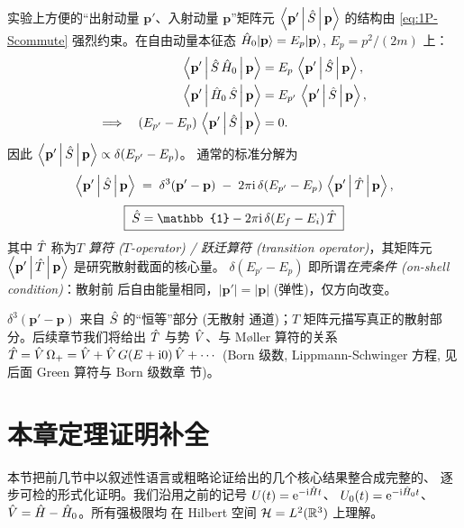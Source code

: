 实验上方便的“出射动量 $\mathbf{p}'$、入射动量 $\mathbf{p}$”矩阵元
$\left\langle \mathbf{p}' \,\middle|\, \hat{S} \,\middle|\, \mathbf{p} \right\rangle$ 的结构由 \eqref{eq:1P-Scommute}
强烈约束。在自由动量本征态 $\hat{H}_0|\mathbf{p}\rangle =
E_p|\mathbf{p}\rangle$, $E_p=p^2/(2m)$ 上：
\begin{align}
  \left\langle \mathbf{p}' \,\middle|\, \hat{S}\,\hat{H}_0 \,\middle|\, \mathbf{p} \right\rangle
  &=E_p\,\left\langle \mathbf{p}' \,\middle|\, \hat{S} \,\middle|\, \mathbf{p} \right\rangle, \nonumber\\
  \left\langle \mathbf{p}' \,\middle|\, \hat{H}_0\,\hat{S} \,\middle|\, \mathbf{p} \right\rangle
  &=E_{p'}\,\left\langle \mathbf{p}' \,\middle|\, \hat{S} \,\middle|\, \mathbf{p} \right\rangle,\nonumber\\
  \Longrightarrow\quad
  (E_{p'}-E_p)\,\left\langle \mathbf{p}' \,\middle|\, \hat{S} \,\middle|\, \mathbf{p} \right\rangle
  &=0.
  \label{eq:1P-onshell-prepare}
\end{align}
因此 $\left\langle \mathbf{p}' \,\middle|\, \hat{S} \,\middle|\, \mathbf{p} \right\rangle\propto \delta(E_{p'}-E_p)$。
通常的标准分解为
\begin{equation}
  \left\langle \mathbf{p}' \,\middle|\, \hat{S} \,\middle|\, \mathbf{p} \right\rangle
  \;=\; \delta^3(\mathbf{p}'-\mathbf{p})
   \;-\; 2\pi\mathrm{i}\,\delta(E_{p'}-E_p)\,
        \left\langle \mathbf{p}' \,\middle|\, \hat{T} \,\middle|\, \mathbf{p} \right\rangle,
  \label{eq:1P-StoT}
\end{equation}
\begin{equation}
  \boxed{\;\Smat = \mathbb{1} - 2\pi\rmi\,\delta(E_f-E_i)\,\Tmat\;}
\end{equation}
其中 $\hat{T}$ 称为\emph{$T$ 算符 ($T$-operator) / 跃迁算符
(transition operator)}，其矩阵元
$\left\langle \mathbf{p}' \,\middle|\, \hat{T} \,\middle|\, \mathbf{p} \right\rangle$ 是研究散射截面的核心量。
$\delta(E_{p'}-E_p)$ 即所谓\emph{在壳条件 (on-shell condition)}：散射前
后自由能量相同，$|\mathbf{p}'|=|\mathbf{p}|$ (弹性)，仅方向改变。

\begin{remark}
$\delta^3(\mathbf{p}'-\mathbf{p})$ 来自 $\hat{S}$ 的“恒等”部分 (无散射
通道)；$T$ 矩阵元描写真正的散射部分。后续章节我们将给出
$\hat{T}$ 与势 $\hat{V}$、与 Møller 算符的关系
$\hat{T} = \hat{V}\,\Omega_+ = \hat{V} + \hat{V}\,G(E+\mathrm{i} 0)\,\hat{V} + \cdots$
(Born 级数, Lippmann-Schwinger 方程, 见后面 Green 算符与 Born 级数章
节)。
\end{remark}

\section{本章定理证明补全}
\label{sec:1P-proofs}

本节把前几节中以叙述性语言或粗略论证给出的几个核心结果整合成完整的、
逐步可检的形式化证明。我们沿用之前的记号 $U(t)=\mathrm{e}^{-\mathrm{i}\hat{H} t}$、
$U_0(t)=\mathrm{e}^{-\mathrm{i}\hat{H}_0 t}$、$\hat{V}=\hat{H}-\hat{H}_0$。所有强极限均
在 Hilbert 空间 $\mathcal{H}=L^2(\mathbb{R}^3)$ 上理解。
\providecommand{\slim}{\operatorname*{s\text{-}lim}}

